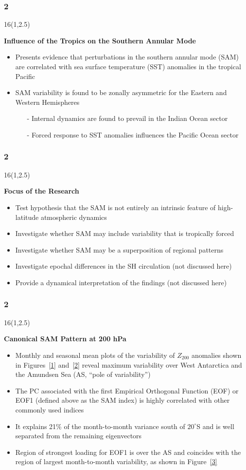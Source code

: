 \documentclass{beamer}
\newcommand\FrameText[1]{
\begin{textblock}{16}(1,2.5)
\raggedright #1
\end{textblock}}
\begin{document}
\begin{frame}
\frametitle{2}
\FrameText{\bf{\large Influence of the Tropics on the Southern Annular
  Mode}}
\begin{itemize}
\item Presents evidence that perturbations in the southern
  annular mode (SAM) are correlated with sea surface temperature (SST)
  anomalies in the tropical Pacific
\item SAM variability is found to be zonally asymmetric for the
  Eastern and Western Hemispheres
\begin{itemize}
\scriptsize
\item[-] Internal dynamics are found to prevail in the Indian Ocean sector
\item[-] Forced response to SST anomalies influences the Pacific Ocean sector
\end{itemize}
\end{itemize}
\end{frame}

\begin{frame}
\frametitle{2}
\FrameText{\bf{\large Focus of the Research}}
\begin{itemize}
\item Test hypothesis that the SAM is not entirely an intrinsic feature of high-latitude atmospheric dynamics
\item Investigate whether SAM may include variability that is tropically forced
\item Investigate whether SAM may be a superposition of regional patterns
\item Investigate epochal differences in the SH circulation (not discussed here)
\item Provide a dynamical interpretation of the findings (not discussed here)
\end{itemize}
\end{frame}

\begin{frame}
\frametitle{2}
\FrameText{\bf{\large Canonical SAM Pattern at 200 hPa}}
\begin{itemize}
\item Monthly and seasonal mean plots of the variability of
  $Z_{200}$ anomalies shown in Figures~\ref{1} and~\ref{2} reveal maximum
  variability over West Antarctica and the Amundsen Sea (AS, ``pole of variability'')
\item The PC associated with the first Empirical Orthogonal
  Function (EOF) or EOF1 (defined above as the SAM index) is highly
  correlated with other commonly used indices
\item It explains 21\% of the month-to-month variance south of
  $20^{\circ}$S and is well separated from the remaining eigenvectors
\item Region of strongest loading for EOF1 is over the AS and
  coincides with the region of largest month-to-month variability, as
  shown in Figure~\ref{3} 
\end{itemize}
\end{frame}
\end{document}
